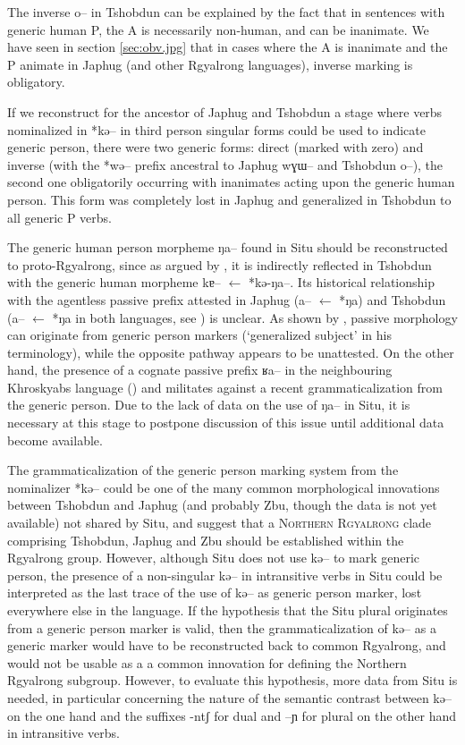 \documentclass[oldfontcommands,oneside,a4paper,11pt]{article}
\newcommand{\ipa}[1]{{\phon \mbox{#1}}} %
\begin{document}
The inverse  \ipa{o--} in Tshobdun can be explained by  the fact that in sentences with generic human P, the A is necessarily non-human, and can be inanimate. We have seen in section \ref{sec:obv.jpg} that in cases where the A is inanimate and the P animate in Japhug (and other Rgyalrong languages), inverse marking is obligatory. 


If we reconstruct for the ancestor of Japhug and Tshobdun a stage where verbs nominalized in *\ipa{kə--} in third person singular forms could be used to indicate generic person, there were two generic forms: direct (marked with zero) and inverse (with the *\ipa{wə--} prefix ancestral to Japhug \ipa{wɣɯ--} and Tshobdun \ipa{o--}), the second one obligatorily occurring with inanimates acting upon the generic human person. This form was completely lost in Japhug and generalized in Tshobdun to all generic P verbs.

The generic human person morpheme \ipa{ŋa--} found in Situ should be reconstructed to proto-Rgyalrong, since as argued by  \citet[244]{sun14generic}, it is indirectly reflected in Tshobdun with the generic human morpheme \ipa{kɐ--} $\leftarrow$ *\ipa{kə-ŋa--}. Its historical relationship with the  agentless passive prefix attested in Japhug  (\ipa{a--} $\leftarrow$ *\ipa{ŋa}) and Tshobdun (\ipa{a--} $\leftarrow$ *\ipa{ŋa} in both languages, see \citealt{jacques12demotion}) is unclear. As shown by \citet[49-50]{haspelmath90passive}, passive morphology can originate from generic person markers (`generalized subject' in his terminology), while the opposite pathway appears to be unattested. On the other hand, the presence of a cognate passive prefix \ipa{ʁa--} in the neighbouring Khroskyabs language (\citealt[152-154]{lai13affixale}) and militates against a recent grammaticalization from the generic person. Due to the lack of data on the use of \ipa{ŋa--} in Situ, it is necessary at this stage to postpone discussion of this issue until additional data become available.


The grammaticalization of the generic person marking system from the nominalizer *\ipa{kə--} could be one of the many common morphological innovations between Tshobdun and Japhug (and probably Zbu, though the data is not yet available) not shared by Situ, and suggest that a \textsc{Northern Rgyalrong} clade comprising Tshobdun, Japhug and Zbu should be established within the Rgyalrong group. However, although Situ does not use \ipa{kə--} to mark generic person,  the presence of a non-singular \ipa{kə--} in intransitive verbs in Situ could be interpreted as the last trace of the use of \ipa{kə--} as generic person marker, lost everywhere else in the language. If the hypothesis that the Situ plural originates from a generic person marker is valid, then the grammaticalization  of \ipa{kə--} as a generic marker would have to be reconstructed back to common Rgyalrong, and would not be usable as a a common innovation for defining the Northern Rgyalrong subgroup. However, to evaluate  this hypothesis, more data from Situ is needed, in particular concerning the nature of the semantic contrast between \ipa{kə--} on the one hand and the suffixes \ipa{-ntʃ} for dual and \ipa{--ɲ} for plural on the other hand in intransitive verbs.
\end{document}
